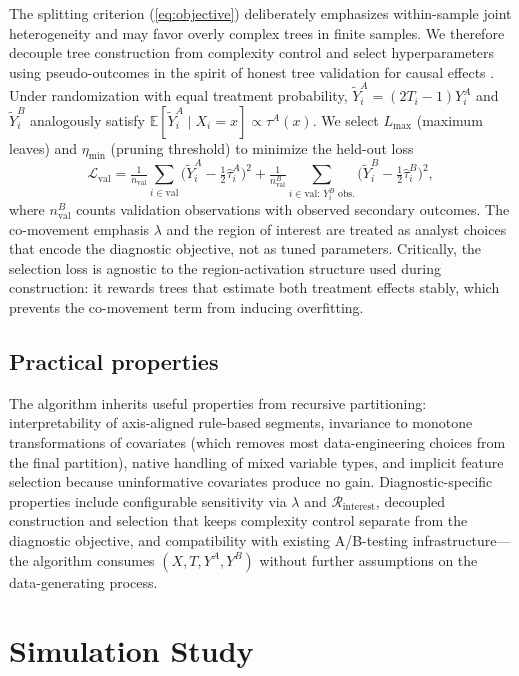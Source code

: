 \documentclass[12pt,a4paper]{article}
\begin{document}
The splitting criterion (\ref{eq:objective}) deliberately emphasizes within-sample joint heterogeneity and may favor overly complex trees in finite samples. We therefore decouple tree construction from complexity control and select hyperparameters using pseudo-outcomes in the spirit of honest tree validation for causal effects \citep{athey2016recursive}. Under randomization with equal treatment probability, $\tilde Y^A_i=(2T_i-1)Y^A_i$ and $\tilde Y^B_i$ analogously satisfy $\mathbb{E}[\tilde Y^A_i\mid X_i=x]\propto\tau^A(x)$. We select $L_{\max}$ (maximum leaves) and $\eta_{\min}$ (pruning threshold) to minimize the held-out loss
%
\begin{equation*}
\mathcal{L}_{\text{val}}=\tfrac{1}{n_{\text{val}}}\sum_{i\in\text{val}}\bigl(\tilde Y^A_i-\tfrac{1}{2}\hat\tau^A_i\bigr)^2+\tfrac{1}{n_{\text{val}}^B}\!\sum_{i\in\text{val}:\,Y^B_i\text{ obs.}}\!\bigl(\tilde Y^B_i-\tfrac{1}{2}\hat\tau^B_i\bigr)^2,
\end{equation*}
%
where $n_{\text{val}}^B$ counts validation observations with observed secondary outcomes. The co-movement emphasis $\lambda$ and the region of interest are treated as analyst choices that encode the diagnostic objective, not as tuned parameters. Critically, the selection loss is agnostic to the region-activation structure used during construction: it rewards trees that estimate both treatment effects stably, which prevents the co-movement term from inducing overfitting.

\subsection{Practical properties}

The algorithm inherits useful properties from recursive partitioning: interpretability of axis-aligned rule-based segments, invariance to monotone transformations of covariates (which removes most data-engineering choices from the final partition), native handling of mixed variable types, and implicit feature selection because uninformative covariates produce no gain. Diagnostic-specific properties include configurable sensitivity via $\lambda$ and $\mathcal{R}_{\text{interest}}$, decoupled construction and selection that keeps complexity control separate from the diagnostic objective, and compatibility with existing A/B-testing infrastructure---the algorithm consumes $(X,T,Y^A,Y^B)$ without further assumptions on the data-generating process.

\section{Simulation Study}
\label{sec:simulation}
\end{document}
